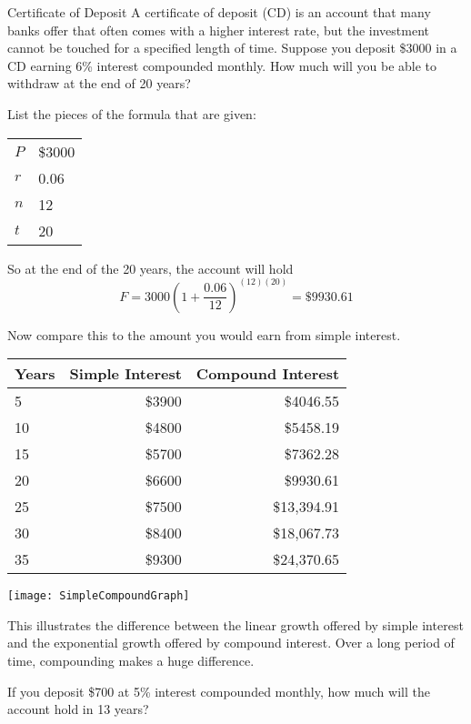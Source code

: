 \begin{example}{Certificate of Deposit}
A certificate of deposit (CD) is an account that many banks offer that often comes with a higher interest rate, but the investment cannot be touched for a specified length of time.  Suppose you deposit \$3000 in a CD earning 6\% interest compounded monthly.  How much will you be able to withdraw at the end of 20 years?

\sol
List the pieces of the formula that are given:
\begin{center}
\begin{tabular}{l l}
$P$ & \$3000\\
$r$ & 0.06\\
$n$ & 12\\
$t$ & 20
\end{tabular}
\end{center}
So at the end of the 20 years, the account will hold 
\[F = 3000\left(1+\dfrac{0.06}{12}\right)^{(12)(20)} = \boxed{\$9930.61}\]

\solline
Now compare this to the amount you would earn from simple interest.
\begin{center}
\begin{tabular}{l | r | r}
Years & Simple Interest & Compound Interest\\
\hline
5 & \$3900 & \$4046.55\\
10 & \$4800 & \$5458.19\\
15 & \$5700 & \$7362.28\\
20 & \$6600 & \$9930.61\\
25 & \$7500 & \$13,394.91\\
30 & \$8400 & \$18,067.73\\
35 & \$9300 & \$24,370.65
\end{tabular}
\vspace{0.2in}

\texttt{[image: SimpleCompoundGraph]}
\end{center}
This illustrates the difference between the linear growth offered by simple interest and the exponential growth offered by compound interest.  Over a long period of time, compounding makes a huge difference.
\end{example}

\begin{try}
If you deposit \$700 at 5\% interest compounded monthly, how much will the account hold in 13 years?
\end{try}
\pagebreak
\text{}
\vfill

